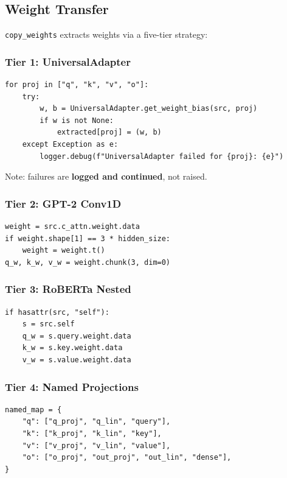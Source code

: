 \subsection{Weight Transfer}

\texttt{copy\_weights} extracts weights via a five-tier strategy:

\subsubsection{Tier 1: UniversalAdapter}

\begin{lstlisting}
for proj in ["q", "k", "v", "o"]:
    try:
        w, b = UniversalAdapter.get_weight_bias(src, proj)
        if w is not None:
            extracted[proj] = (w, b)
    except Exception as e:
        logger.debug(f"UniversalAdapter failed for {proj}: {e}")
\end{lstlisting}

Note: failures are \textbf{logged and continued}, not raised.

\subsubsection{Tier 2: GPT-2 Conv1D}

\begin{lstlisting}
weight = src.c_attn.weight.data
if weight.shape[1] == 3 * hidden_size:
    weight = weight.t()
q_w, k_w, v_w = weight.chunk(3, dim=0)
\end{lstlisting}

\subsubsection{Tier 3: RoBERTa Nested}

\begin{lstlisting}
if hasattr(src, "self"):
    s = src.self
    q_w = s.query.weight.data
    k_w = s.key.weight.data
    v_w = s.value.weight.data
\end{lstlisting}

\subsubsection{Tier 4: Named Projections}

\begin{lstlisting}
named_map = {
    "q": ["q_proj", "q_lin", "query"],
    "k": ["k_proj", "k_lin", "key"],
    "v": ["v_proj", "v_lin", "value"],
    "o": ["o_proj", "out_proj", "out_lin", "dense"],
}
\end{lstlisting}

